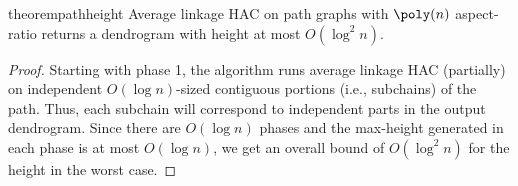 \begin{restatable}{theorem}{pathheight}\label{thm:pathheight}
    Average linkage HAC on path graphs with $\poly(n)$ aspect-ratio returns a dendrogram with height at most $O(\log^2n)$.
\end{restatable}

\begin{proof}
    Starting with phase 1, the algorithm runs average linkage HAC (partially) on independent $O(\log n)$-sized contiguous portions (i.e., subchains) of the path. Thus, each subchain will correspond to independent parts in the output dendrogram. Since there are $O(\log n)$ phases and the max-height generated in each phase is at most $O(\log n)$, we get an overall bound of $O(\log^2n)$ for the height in the worst case.
\end{proof}
